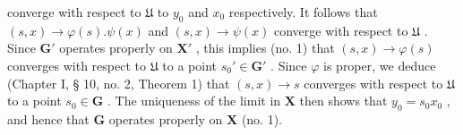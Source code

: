 converge with respect to \(\mathfrak{U}\) to \(y_0\) and \(x_0\) respectively. It follows that \((s, x) \to \varphi(s). \psi(x)\) and \((s, x) \to \psi(x)\) converge with respect to \(\mathfrak{U}\) . Since \(\mathbf{G}'\) operates properly on \(\mathbf{X}'\) , this implies (no. 1) that \((s, x) \to \varphi(s)\) converges with respect to \(\mathfrak{U}\) to a point \(s_0' \in \mathbf{G}'\) . Since \(\varphi\) is proper, we deduce (Chapter I, § 10, no. 2, Theorem 1) that \((s, x) \to s\) converges with respect to \(\mathfrak{U}\) to a point \(s_0 \in \mathbf{G}\) . The uniqueness of the limit in \(\mathbf{X}\) then shows that \(y_0 = s_0 x_0\) , and hence that \(\mathbf{G}\) operates properly on \(\mathbf{X}\) (no. 1).

